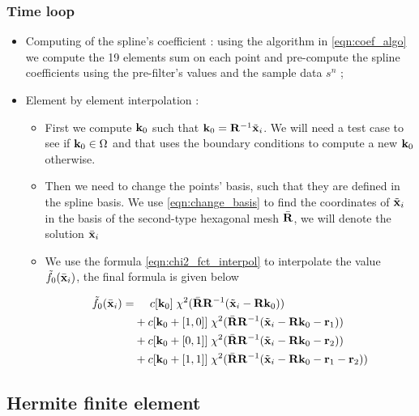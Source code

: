 \documentclass[11pt,a4paper]{amsart}
\begin{document}
\subsubsection*{Time loop}

\begin{itemize}
	\item Computing of the spline's coefficient : using the algorithm in \eqref{eqn:coef_algo} we compute the 19 elements sum on each point and pre-compute the spline coefficients using the pre-filter's values and the sample data $s^n$ ;
	\item Element by element interpolation :
		\begin{itemize}
			\item First we compute ${\mathbf{k}}_0$ such that ${\mathbf{k}}_0 = {\mathbf{R}}^ {-1} \tilde{\mathbf{x}}_i$.  We will need a test case to see if ${\mathbf{k}_0} \in \Omega$ and that uses the boundary conditions to compute a new ${\mathbf{k}_0}$ otherwise.
			\item Then we need to change the points' basis, such that they are defined in the spline basis. We use \eqref{eqn:change_basis} to find the coordinates of $\tilde{\mathbf{x}}_i$ in the basis of the second-type hexagonal mesh $\bar{\mathbf{R}}$, we will denote the solution $\bar{\mathbf{x}}_i$
			\item We use the formula \eqref{eqn:chi2_fct_interpol} to interpolate the value $\tilde{f}_0(\bar{\mathbf{x}}_i)$, the final formula is given below
			
\begin{align}
\label{eqn:chi2_fct_interpol2}
\tilde{f}_0(\bar{\mathbf{x}}_i) =& \;\;\;\;\; c[\mathbf{k}_0] \; \chi^2(\bar{\mathbf{R}}\mathbf{R}^{-1}(\tilde{\mathbf{x}}_i - \mathbf{R}\mathbf{k}_0)) \nonumber\\
	&+ c[\mathbf{k}_0 +[1,0]]\; \chi^2(\bar{\mathbf{R}}\mathbf{R}^{-1}(\tilde{\mathbf{x}}_i - \mathbf{R}\mathbf{k}_0 - \mathbf{r}_1)) \nonumber\\
	&+ c[\mathbf{k}_0 +[0,1]]\; \chi^2(\bar{\mathbf{R}}\mathbf{R}^{-1}(\tilde{\mathbf{x}}_i - \mathbf{R}\mathbf{k}_0 - \mathbf{r}_2)) \nonumber\\
	&+ c[\mathbf{k}_0 +[1,1]]\; \chi^2(\bar{\mathbf{R}}\mathbf{R}^{-1}(\tilde{\mathbf{x}}_i - \mathbf{R}\mathbf{k}_0 - \mathbf{r}_1 - \mathbf{r}_2))
\end{align}

		\end{itemize}
\end{itemize}




\subsection{Hermite finite element}
\setcounter{equation}{0}
\end{document}
